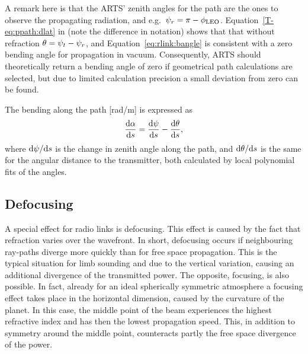 A remark here is that the ARTS' zenith angles for the path are the ones to
observe the propagating radiation, and
e.g.\ $\psi_{r}=\pi-\phi_{\mathrm{LEO}}$. Equation~\ref{T-eq:ppath:dlat} in
\theory (note the difference in notation) shows that that without refraction
$\theta=\psi_{t} - \psi_{r}$, and Equation~\ref{eq:rlink:bangle} is
consistent with a zero bending angle for propagation in vacuum. Consequently,
ARTS should theoretically return a bending angle of zero if geometrical path
calculations are selected, but due to limited calculation precision a small
deviation from zero can be found.

The bending along the path [rad/m] is expressed as
\begin{equation} 
  \frac{\mathrm{d} \alpha}{\mathrm{d} s} = \frac{\mathrm{d} \psi}{\mathrm{d} s} - 
                                   \frac{\mathrm{d} \theta }{\mathrm{d} s},
  \label{eq:rlink:dbangleds}
\end{equation}
where $\mathrm{d}\psi/\mathrm{d} s$ is the change in zenith angle along the path,
and $\mathrm{d}\theta/\mathrm{d} s$ is the same for the angular distance to the
transmitter, both calculated by local polynomial fits of the angles.



\subsection{Defocusing}
\label{sec:rlink:defoc}
%
A special effect for radio links is defocusing. This effect is caused by the
fact that refraction varies over the wavefront. In short, defocusing occurs if
neighbouring ray-paths diverge more quickly than for free space propagation.
This is the typical situation for limb sounding and due to the vertical
variation, causing an additional divergence of the transmitted power. The
opposite, focusing, is also possible. In fact, already for an ideal spherically
symmetric atmosphere a focusing effect takes place in the horizontal
dimension, caused by the curvature of the planet. In this case, the middle
point of the beam experiences the highest refractive index and has then the
lowest propagation speed. This, in addition to symmetry around the middle
point, counteracts partly the free space divergence of the power.

